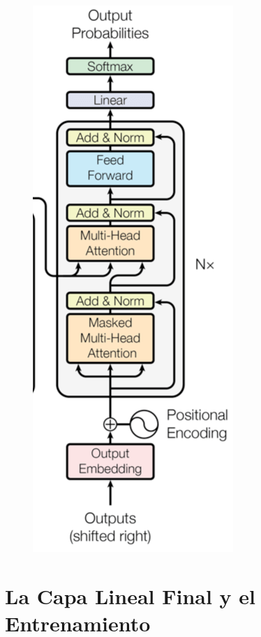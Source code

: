 \begin{figure}[h]
  \centering
  \includegraphics[scale=0.29]{pics/transformerdecoder.png}
\end{figure}

\section{La Capa Lineal Final y el Entrenamiento}

